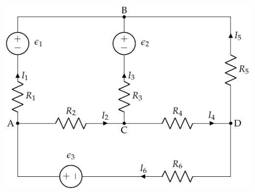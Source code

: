 \documentclass[aspectratio=169, usenames,svgnames,dvipsnames]{beamer}
\begin{document}
\begin{frame}[label={sec:orgf304212}]{}
\begin{center}
\includegraphics[height=0.95\textheight]{../figs/mallas1.pdf}
\end{center}
\end{frame}
\end{document}
